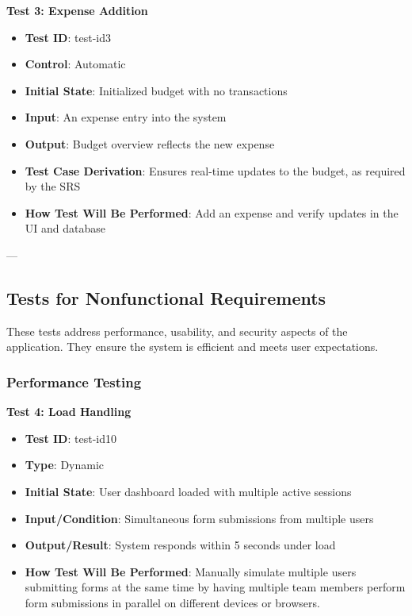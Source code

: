\documentclass[12pt, titlepage]{article}
\begin{document}
\textbf{Test 3: Expense Addition}
\begin{itemize}
    \item \textbf{Test ID}: test-id3
    \item \textbf{Control}: Automatic
    \item \textbf{Initial State}: Initialized budget with no transactions
    \item \textbf{Input}: An expense entry into the system
    \item \textbf{Output}: Budget overview reflects the new expense
    \item \textbf{Test Case Derivation}: Ensures real-time updates to the budget, as required by the SRS
    \item \textbf{How Test Will Be Performed}: Add an expense and verify updates in the UI and database
\end{itemize}

---

\subsection{Tests for Nonfunctional Requirements}

These tests address performance, usability, and security aspects of the application. They ensure the system is efficient and meets user expectations.

\subsubsection{Performance Testing}

\textbf{Test 4: Load Handling}
\begin{itemize}
    \item \textbf{Test ID}: test-id10
    \item \textbf{Type}: Dynamic
    \item \textbf{Initial State}: User dashboard loaded with multiple active sessions
    \item \textbf{Input/Condition}: Simultaneous form submissions from multiple users
    \item \textbf{Output/Result}: System responds within 5 seconds under load
    \item \textbf{How Test Will Be Performed}: Manually simulate multiple users submitting forms at the same time by having multiple team members perform form submissions in parallel on different devices or browsers.
\end{itemize}
\end{document}
